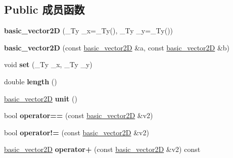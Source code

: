 \subsection*{Public 成员函数}
\begin{DoxyCompactItemize}
\item 
\mbox{\label{structbasic__vector2_d_ad8b15c63d5ad6e86e1192ff820f53a67}} 
{\bfseries basic\+\_\+vector2D} (\+\_\+\+Ty \+\_\+x=\+\_\+\+Ty(), \+\_\+\+Ty \+\_\+y=\+\_\+\+Ty())
\item 
\mbox{\label{structbasic__vector2_d_a348d37f966eeda40626112688649cb70}} 
{\bfseries basic\+\_\+vector2D} (const \hyperlink{structbasic__vector2_d}{basic\+\_\+vector2D} \&a, const \hyperlink{structbasic__vector2_d}{basic\+\_\+vector2D} \&b)
\item 
\mbox{\label{structbasic__vector2_d_a4085ab29a73798d9a1958eef96bf5f33}} 
void {\bfseries set} (\+\_\+\+Ty \+\_\+x, \+\_\+\+Ty \+\_\+y)
\item 
\mbox{\label{structbasic__vector2_d_a9a5e3046e0e3c08caa6bc56e6cf2d270}} 
double {\bfseries length} ()
\item 
\mbox{\label{structbasic__vector2_d_aa4b24c577ef24c814370beebc22f3bb8}} 
\hyperlink{structbasic__vector2_d}{basic\+\_\+vector2D} {\bfseries unit} ()
\item 
\mbox{\label{structbasic__vector2_d_a51f3108036d2f3df7a4d5da488717d71}} 
bool {\bfseries operator==} (const \hyperlink{structbasic__vector2_d}{basic\+\_\+vector2D} \&v2)
\item 
\mbox{\label{structbasic__vector2_d_abd00075de4f4635651d57ede1800ad27}} 
bool {\bfseries operator!=} (const \hyperlink{structbasic__vector2_d}{basic\+\_\+vector2D} \&v2)
\item 
\mbox{\label{structbasic__vector2_d_a0d01680904379f6984ee35cbe0ba3cf2}} 
\hyperlink{structbasic__vector2_d}{basic\+\_\+vector2D} {\bfseries operator+} (const \hyperlink{structbasic__vector2_d}{basic\+\_\+vector2D} \&v2) const
\item 

\end{DoxyCompactItemize}
